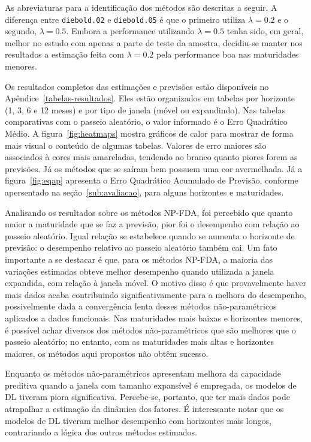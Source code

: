 \documentclass[
	12pt,				%
	openright,			%
	oneside,			%
	a4paper,			%
	english,			%
	brazil				%
	]{dissertacao-ufrgs-abntex2}
\begin{document}
As abreviaturas para a identificação dos métodos são descritas a seguir. A diferença entre \texttt{diebold.02} e \texttt{diebold.05} é que o primeiro utiliza $\lambda=0.2$ e o segundo, $\lambda=0.5$. Embora a performance utilizando $\lambda=0.5$ tenha sido, em geral, melhor no estudo com apenas a parte de teste da amostra, decidiu-se manter nos resultados a estimação feita com $\lambda=0.2$ pela performance boa nas maturidades menores.

Os resultados completos das estimações e previsões estão disponíveis no Apêndice~\ref{tabelas-resultados}. Eles estão organizados em tabelas por horizonte (1, 3, 6 e 12 meses) e por tipo de janela (móvel ou expandindo). Nas tabelas comparativas com o passeio aleatório, o valor informado é o Erro Quadrático Médio. A figura~\ref{fig:heatmaps} mostra gráficos de calor para mostrar de forma mais visual o conteúdo de algumas tabelas. Valores de erro maiores são associados à cores mais amareladas, tendendo ao branco quanto piores forem as previsões. Já os métodos que se saíram bem possuem uma cor avermelhada. Já a figura~\ref{fig:eqap} apresenta o Erro Quadrático Acumulado de Previsão, conforme apersentado na seção~\ref{sub:avaliacao}, para alguns horizontes e maturidades.

Analisando os resultados sobre os métodos NP-FDA, foi percebido que quanto maior a maturidade que se faz a previsão, pior foi o desempenho com relação ao passeio aleatório. Igual relação se estabelece quando se aumenta o horizonte de previsão: o desempenho relativo ao passeio aleatório também cai. Um fato importante a se destacar é que, para os métodos NP-FDA, a maioria das variações estimadas obteve melhor desempenho quando utilizada a janela expandida, com relação à janela móvel. O motivo disso é que provavelmente haver mais dados acaba contribuindo significativamente para a melhora do desempenho, possivelmente dada a convergência lenta desses métodos não-paramétricos aplicados a dados funcionais. 
Nas maturidades mais baixas e horizontes menores, é possível achar diversos dos métodos não-paramétricos que são melhores que o passeio aleatório; no entanto, com as maturidades mais altas e horizontes maiores, os métodos aqui propostos não obtêm sucesso.

Enquanto os métodos não-paramétricos apresentam melhora da capacidade preditiva quando a janela com tamanho expansível é empregada, os modelos de DL tiveram piora significativa. Percebe-se, portanto, que ter mais dados pode atrapalhar a estimação da dinâmica dos fatores. É interessante notar que os modelos de DL tiveram melhor desempenho com horizontes mais longos, contrariando a lógica dos outros métodos estimados.
\end{document}
